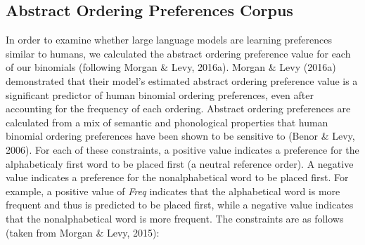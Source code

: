 \documentclass[
  10pt,
  nohyperref]{acl}
\begin{document}
\subsection{Abstract Ordering Preferences
Corpus}\label{abstract-ordering-preferences-corpus}

In order to examine whether large language models are learning
preferences similar to humans, we calculated the abstract ordering
preference value for each of our binomials (following Morgan \& Levy,
2016a). Morgan \& Levy (2016a) demonstrated that their model's estimated
abstract ordering preference value is a significant predictor of human
binomial ordering preferences, even after accounting for the frequency
of each ordering. Abstract ordering preferences are calculated from a
mix of semantic and phonological properties that human binomial ordering
preferences have been shown to be sensitive to (Benor \& Levy, 2006).
For each of these constraints, a positive value indicates a preference
for the alphabeticaly first word to be placed first (a neutral reference
order). A negative value indicates a preference for the nonalphabetical
word to be placed first. For example, a positive value of \emph{Freq}
indicates that the alphabetical word is more frequent and thus is
predicted to be placed first, while a negative value indicates that the
nonalphabetical word is more frequent. The constraints are as follows
(taken from Morgan \& Levy, 2015):
\end{document}

